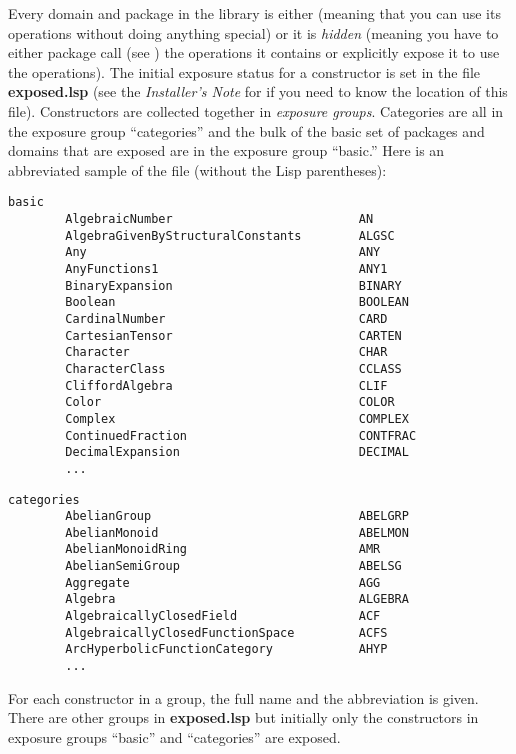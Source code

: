 Every
domain and package in the \Language{} library
is
either
 (meaning that you can use its operations without doing
anything special) or it is {\it hidden} (meaning you have to either
package call
(see )
the operations it contains or explicitly expose it to use the
operations).
The initial exposure status for a constructor is set in the
file {\bf exposed.lsp} (see the {\it Installer's Note}
for \Language{}
if you need to know the location of this file).
Constructors are collected together in
{\it exposure groups}.
Categories are all in the exposure group ``categories'' and the
bulk of the basic set of packages and domains that are exposed
are in the exposure group ``basic.''
Here is an abbreviated sample of the file (without the Lisp parentheses):
\begin{verbatim}
basic
        AlgebraicNumber                          AN
        AlgebraGivenByStructuralConstants        ALGSC
        Any                                      ANY
        AnyFunctions1                            ANY1
        BinaryExpansion                          BINARY
        Boolean                                  BOOLEAN
        CardinalNumber                           CARD
        CartesianTensor                          CARTEN
        Character                                CHAR
        CharacterClass                           CCLASS
        CliffordAlgebra                          CLIF
        Color                                    COLOR
        Complex                                  COMPLEX
        ContinuedFraction                        CONTFRAC
        DecimalExpansion                         DECIMAL
        ...
\end{verbatim}
\begin{verbatim}
categories
        AbelianGroup                             ABELGRP
        AbelianMonoid                            ABELMON
        AbelianMonoidRing                        AMR
        AbelianSemiGroup                         ABELSG
        Aggregate                                AGG
        Algebra                                  ALGEBRA
        AlgebraicallyClosedField                 ACF
        AlgebraicallyClosedFunctionSpace         ACFS
        ArcHyperbolicFunctionCategory            AHYP
        ...
\end{verbatim}
For each constructor in a group, the full name and the abbreviation
is given.
There are other groups in {\bf exposed.lsp} but initially only the
constructors in exposure groups ``basic'' and ``categories'' are exposed.

